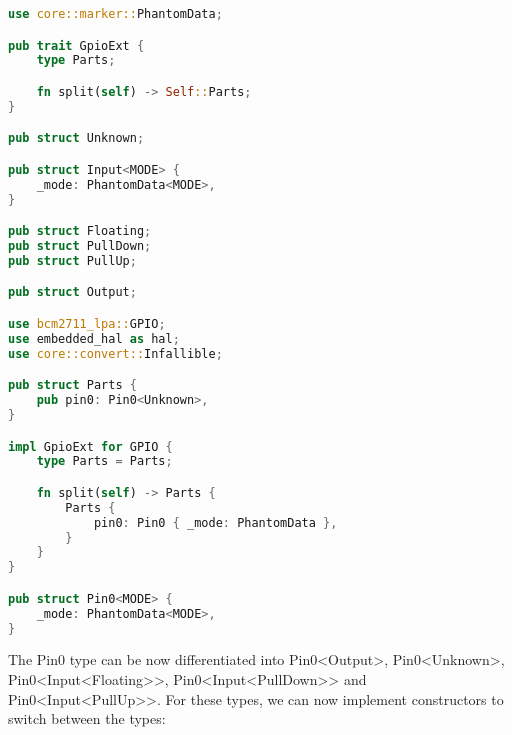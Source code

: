 \begin{lstlisting}[language=Rust,style=colouredRust]
use core::marker::PhantomData;

pub trait GpioExt {
    type Parts;

    fn split(self) -> Self::Parts;
}

pub struct Unknown;

pub struct Input<MODE> {
    _mode: PhantomData<MODE>,
}

pub struct Floating;
pub struct PullDown;
pub struct PullUp;

pub struct Output;

use bcm2711_lpa::GPIO;
use embedded_hal as hal;
use core::convert::Infallible;

pub struct Parts {
    pub pin0: Pin0<Unknown>,
}

impl GpioExt for GPIO {
    type Parts = Parts;

    fn split(self) -> Parts {
        Parts {
            pin0: Pin0 { _mode: PhantomData },
        }
    }
}

pub struct Pin0<MODE> {
    _mode: PhantomData<MODE>,
}
\end{lstlisting}

The Pin0 type can be now differentiated into Pin0<Output>, Pin0<Unknown>, Pin0<Input<Floating>>, Pin0<Input<PullDown>> and Pin0<Input<PullUp>>.
For these types, we can now implement constructors to switch between the types:

